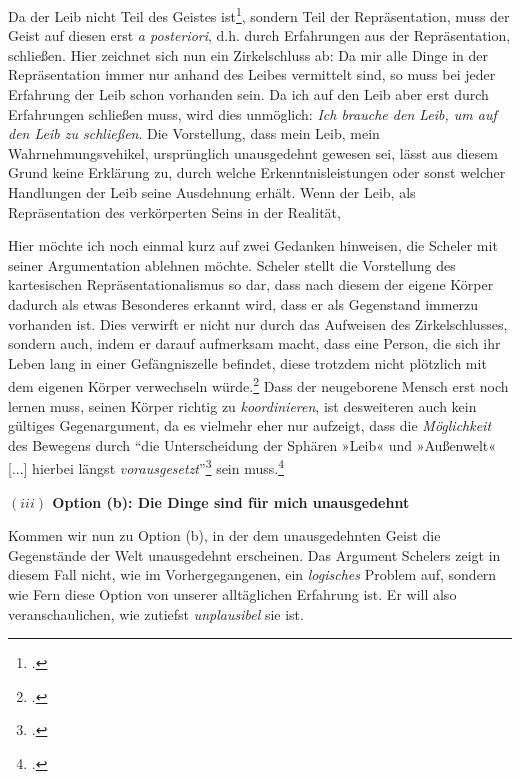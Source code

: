 \documentclass[a4paper, 12pt]{article}
\begin{document}
\begin{onehalfspace}

Da der Leib nicht Teil des Geistes ist\footnote{\Cite[Vgl.][S. 499]{scheler-ethik}.}, sondern Teil der Repräsentation, muss der Geist auf diesen erst \emph{a posteriori}, d.h. durch Erfahrungen aus der Repräsentation, schließen. Hier zeichnet sich nun ein Zirkelschluss ab: Da mir alle Dinge in der Repräsentation immer nur anhand des Leibes vermittelt sind, so muss bei jeder Erfahrung der Leib schon vorhanden sein. Da ich auf den Leib aber erst durch Erfahrungen schließen muss, wird dies unmöglich: \emph{Ich brauche den Leib, um auf den Leib zu schließen}. Die Vorstellung, dass mein Leib, mein Wahrnehmungsvehikel, ursprünglich unausgedehnt gewesen sei, lässt aus diesem Grund keine Erklärung zu, durch welche Erkenntnisleistungen oder sonst welcher Handlungen der Leib seine Ausdehnung erhält. Wenn der Leib, als Repräsentation des verkörperten Seins in der Realität, 

Hier möchte ich noch einmal kurz auf zwei Gedanken hinweisen, die Scheler mit seiner Argumentation ablehnen möchte. Scheler stellt die Vorstellung des kartesischen Repräsentationalismus so dar, dass nach diesem der eigene Körper dadurch als etwas Besonderes erkannt wird, dass er als Gegenstand immerzu vorhanden ist. Dies verwirft er nicht nur durch das Aufweisen des Zirkelschlusses, sondern auch, indem er darauf aufmerksam macht, dass eine Person, die sich ihr Leben lang in einer Gefängniszelle befindet, diese trotzdem nicht plötzlich mit dem eigenen Körper verwechseln würde.\footnote{\Cite[Vgl.][S. 494]{scheler-ethik}.} Dass der neugeborene Mensch erst noch lernen muss, seinen Körper richtig zu \emph{koordinieren}, ist desweiteren auch kein gültiges Gegenargument, da es vielmehr eher nur aufzeigt, dass die \emph{Möglichkeit} des Bewegens durch "`die Unterscheidung der Sphären »Leib« und »Außenwelt« [...] hierbei längst \emph{vorausgesetzt}"'\footnote{\Cite[Siehe][S. 496]{scheler-ethik}.} sein muss.\footnote{\Cite[Vgl. zudem auch][S. 492]{scheler-ethik}.} 


\vspace{5mm}
\noindent\textbf{$(iii)$ Option (b): Die Dinge sind für mich unausgedehnt}


\noindent Kommen wir nun zu Option (b), in der dem unausgedehnten Geist die Gegenstände der Welt unausgedehnt erscheinen. Das Argument Schelers zeigt in diesem Fall nicht, wie im Vorhergegangenen, ein \emph{logisches} Problem auf, sondern wie Fern diese Option von unserer alltäglichen Erfahrung ist. Er will also veranschaulichen, wie zutiefst \emph{unplausibel} sie ist.


\end{onehalfspace}
\end{document}

